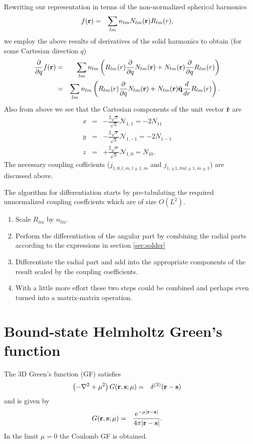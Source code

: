 \documentclass[12pt]{article}
\newcommand{\N}{\mathcal{N}}
\newcommand{\rv}{\vb{r}}
\newcommand{\sv}{\vb{s}}
\newcommand{\rhat}{\hat{\rv}}
\begin{document}
Rewriting our representation in terms of the non-normalized spherical harmonics
\begin{eqnarray}
  f(\rv) & = & \sum_{l m} n_{lm} N_{lm}(\rv) R_{lm}(r) ,
\end{eqnarray}
we employ the above results of derivatives of the solid harmonics to obtain (for some Cartesian direction $q$)
\begin{eqnarray}
  \frac{\partial}{\partial q} f(\rv) & = & \sum_{l m} n_{lm} \left(R_{lm}(r) \frac{\partial}{\partial q} N_{lm}(\rv)  + N_{lm}(\rv)  \frac{\partial}{\partial q} R_{lm}(r) \right) \\
   & = & \sum_{l m} n_{lm} \left( R_{lm}(r) \frac{\partial}{\partial q} N_{lm}(\rv)  + N_{lm}(\rv) \hat{\vb{q}} \frac{d}{dr} R_{lm}(r) \right).
\end{eqnarray}
Also from above we see that the Cartesian components of the unit vector $\rhat$ are
\begin{eqnarray}
  x & = & - \frac{2 \sqrt{\pi}}{\sqrt{3}} \N_{1,1} = -2 N_{11}\\
  y & = & - \frac{2 \sqrt{\pi}}{\sqrt{3}} \N_{1,-1}= -2 N_{1-1} \\
  z & = & + \frac{2 \sqrt{\pi}}{\sqrt{3}} \N_{1,0} = N_{10}.
\end{eqnarray}
The necessary coupling cofficients ($j_{1, 0, l, m, l\pm 1, m}$ and $j_{1, \pm 1, l m l\pm 1, m\pm 1}$) are discussed above.

The algorithm for differentiation starts by pre-tabulating the required unnormalized coupling coeffcients which are of size $O(L^2)$.
\begin{enumerate}
\item Scale $R_{lm}$ by $n_{lm}$. 
\item Perform the differentiation of the angular part by combining the radial parts according to the expressions in section \ref{sec:solder}
\item Differentiate the radial part and add into the appropriate components of the result scaled by the coupling coefficients.
\item With a little more effort these two steps could be combined and perhaps even turned into a matrix-matrix operation.
\end{enumerate}

\section{Bound-state Helmholtz Green's function}

The 3D Green's function (GF) satisfies
\begin{eqnarray}
   \left(-\nabla^2 + \mu^2\right) G(\rv,\sv; \mu) & = & \delta^{(3)}(\rv - \sv)
\end{eqnarray}
and is given by
\begin{eqnarray}
  G(\rv,\sv; \mu) & = & \frac{\mathrm{e}^{-\mu |\rv-\sv|}}{4 \pi |\rv-\sv|} .
\end{eqnarray}
In the limit $\mu=0$ the Coulomb GF is obtained.
\end{document}
